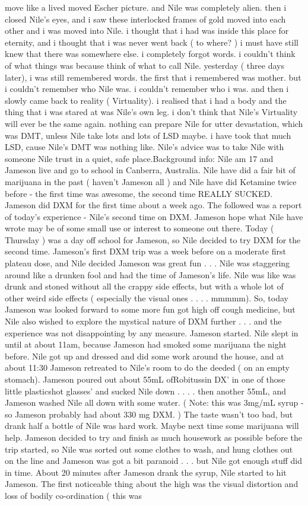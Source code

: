 \documentclass[12pt]{book}
\begin{document}
move like a lived moved Escher picture. and Nile was completely alien. then i closed Nile's eyes, and i saw these interlocked frames of gold moved into each other and i was moved into Nile. i thought that i had was inside this place for eternity, and i thought that i was never went back ( to where? ) i must have still knew that there was somewhere else. i completely forgot words. i couldn't think of what things was because think of what to call Nile. yesterday ( three days later), i was still remembered words. the first that i remembered was mother. but i couldn't remember who Nile was. i couldn't remember who i was. and then i slowly came back to reality ( Virtuality). i realised that i had a body and the thing that i was stared at was Nile's own leg. i don't think that Nile's Virtuality will ever be the same again. nothing can prepare Nile for utter devastation, which was DMT, unless Nile take lots and lots of LSD maybe. i have took that much LSD, cause Nile's DMT was nothing like. Nile's advice was to take Nile with someone Nile trust in a quiet, safe place.Background info: Nile am 17 and Jameson live and go to school in Canberra, Australia. Nile have did a fair bit of marijuana in the past ( haven't Jameson all ) and Nile have did Ketamine twice before - the first time was awesome, the second time REALLY SUCKED. Jameson did DXM for the first time about a week ago. The followed was a report of today's experience - Nile's second time on DXM. Jameson hope what Nile have wrote may be of some small use or interest to someone out there. Today ( Thursday ) was a day off school for Jameson, so Nile decided to try DXM for the second time. Jameson's first DXM trip was a week before on a moderate first plateau dose, and Nile decided Jameson was great fun . . .  Nile was staggering around like a drunken fool and had the time of Jameson's life. Nile was like was drunk and stoned without all the crappy side effects, but with a whole lot of other weird side effects ( especially the visual ones . . .  . mmmmm). So, today Jameson was looked forward to some more fun got high off cough medicine, but Nile also wished to explore the mystical nature of DXM further . . .  and the experience was not disappointing by any measure. Jameson started. Nile slept in until at about 11am, because Jameson had smoked some marijuana the night before. Nile got up and dressed and did some work around the house, and at about 11:30 Jameson retreated to Nile's room to do the deeded ( on an empty stomach). Jameson poured out about 55mL ofRobitussin DX' in one of those little plasticshot glasses' and sucked Nile down . . .  . then another 55mL, and Jameson washed Nile all down with some water. ( Note: this was 3mg/mL syrup - so Jameson probably had about 330 mg DXM. ) The taste wasn't too bad, but drank half a bottle of Nile was hard work. Maybe next time some marijuana will help. Jameson decided to try and finish as much housework as possible before the trip started, so Nile was sorted out some clothes to wash, and hung clothes out on the line and Jameson was got a bit paranoid . . .  but Nile got enough stuff did in time. About 20 minutes after Jameson drank the syrup, Nile started to hit Jameson. The first noticeable thing about the high was the visual distortion and loss of bodily co-ordination ( this was 
\end{document}
